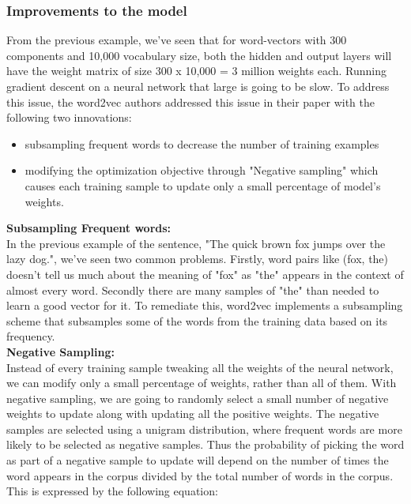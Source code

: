 \subsubsection{Improvements to the model}

From the previous example, we've seen that for word-vectors with 300 components and 10,000 vocabulary size, both the hidden and output layers will have the weight matrix of size 300 x 10,000 = 3 million weights each. Running gradient descent on a neural network that large is going to be slow. To address this issue, the word2vec authors addressed this issue in their paper with the following two innovations:

\begin{itemize}
\item{subsampling frequent words to decrease the number of training examples}
\item{modifying the optimization objective through "Negative sampling" which causes each training sample to update only a small percentage of model's weights.}\\
\end{itemize}
\noindent\textbf{Subsampling Frequent words:}\\

In the previous example of the sentence, "The quick brown fox jumps over the lazy dog.", we've seen two common problems. Firstly, word pairs like (fox, the) doesn't tell us much about the meaning of "fox" as "the" appears in the context of almost every word. Secondly there are many samples of "the" than needed to learn a good vector for it. To remediate this, word2vec implements a subsampling scheme that subsamples some of the words from the training data based on its frequency.\\

\noindent\textbf{Negative Sampling:}\\

Instead of every training sample tweaking all the weights of the neural network, we can modify only a small percentage of weights, rather than all of them. With negative sampling, we are going to randomly select a small number of negative weights to update along with updating all the positive weights. The negative samples are selected using a unigram distribution, where frequent words are more likely to be selected as negative samples. Thus the probability of picking the word as part of a negative sample to update will depend on the number of times the word appears in the corpus divided by the total number of words in the corpus. This is expressed by the following equation:


